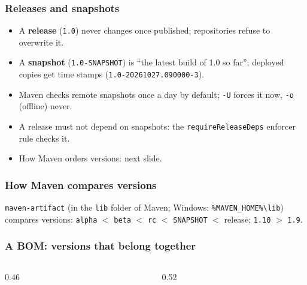 \documentclass[aspectratio=169,10pt,compress]{beamer}
\begin{document}
\begin{frame}[t,fragile] \frametitle{Releases and snapshots}
  \begin{itemize}\small
    \item A \textbf{release} (\texttt{1.0}) never changes once published; repositories refuse to overwrite it.
    \item A \textbf{snapshot} (\texttt{1.0-SNAPSHOT}) is ``the latest build of 1.0 so far''; deployed copies get time stamps (\texttt{1.0-20261027.090000-3}).
    \item Maven checks remote snapshots once a day by default; \texttt{-U} forces it now, \texttt{-o} (offline) never.
    \item A release must not depend on snapshots: the \texttt{requireReleaseDeps} enforcer rule checks it.
    \item How Maven orders versions: next slide.
  \end{itemize}
\end{frame}




\begin{frame}[t,fragile] \frametitle{How Maven compares versions}

  \vspace{0.1em}
  \small
  \texttt{maven-artifact} (in the \texttt{lib} folder of Maven; Windows: \texttt{\%MAVEN\_HOME\%\textbackslash lib}) compares versions: \texttt{alpha} $<$ \texttt{beta} $<$ \texttt{rc} $<$ \texttt{SNAPSHOT} $<$ release; \texttt{1.10} $>$ \texttt{1.9}.
\end{frame}





\begin{frame}[t,fragile] \frametitle{A BOM: versions that belong together}
  \begin{columns}[T]
    \begin{column}{0.46\textwidth}
    \end{column}
    \begin{column}{0.52\textwidth}
    \end{column}
  \end{columns}
\end{frame}
\end{document}
